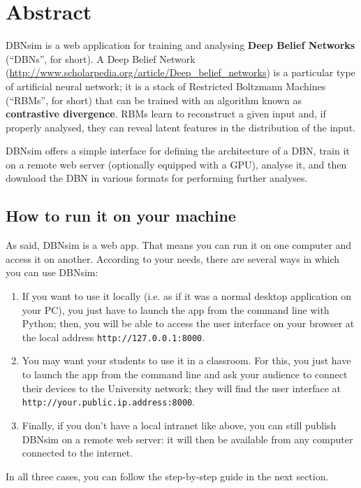 \section{Abstract}

DBNsim is a web application for training and analysing \textbf{Deep Belief Networks} (``DBNs'', for short). A Deep Belief Network (\url{http://www.scholarpedia.org/article/Deep_belief_networks}) is a particular type of artificial neural network; it is a stack of Restricted Boltzmann Machines (``RBMs'', for short) that can be trained with an algorithm known as \textbf{contrastive divergence}. RBMs learn to reconstruct a given input and, if properly analysed, they can reveal latent features in the distribution of the input.

DBNsim offers a simple interface for defining the architecture of a DBN, train it on a remote web server (optionally equipped with a GPU), analyse it, and then download the DBN in various formats for performing further analyses.


\subsection{How to run it on your machine}

As said, DBNsim is a web app. That means you can run it on one computer and access it on another. According to your needs, there are several ways in which you can use DBNsim:
\begin{enumerate}
	\item If you want to use it locally (i.e. as if it was a normal desktop application on your PC), you just have to launch the app from the command line with Python; then, you will be able to access the user interface on your browser at the local address \texttt{http://127.0.0.1:8000}.
	\item You may want your students to use it in a classroom. For this, you just have to launch the app from the command line and ask your audience to connect their devices to the University network; they will find the user interface at \texttt{http://your.public.ip.address:8000}.
	\item Finally, if you don't have a local intranet like above, you can still publish DBNsim on a remote web server: it will then be available from any computer connected to the internet.
\end{enumerate}

In all three cases, you can follow the step-by-step guide in the next section.

